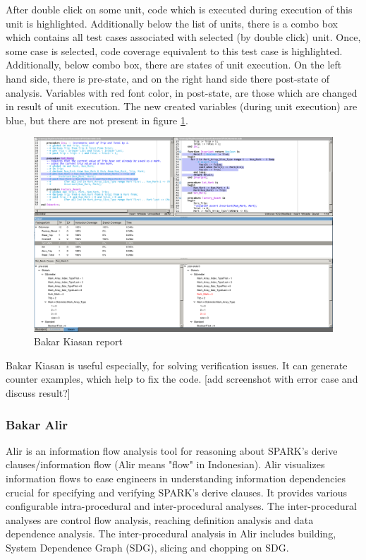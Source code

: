 After double click on some unit, code which is executed during execution of this unit is highlighted. Additionally below the list of units, there is a combo box which contains all test cases associated with selected (by double click) unit. Once, some case is selected, code coverage equivalent to this test case is highlighted. Additionally, below combo box, there are states of unit execution. On the left hand side, there is pre-state, and on the right hand side there post-state of analysis. Variables with red font color, in post-state, are those which are changed in result of unit execution. The new created variables (during unit execution) are blue, but there are not present in figure \ref{figure:kiasan-sample}.

\begin{figure}[ht]%
    \begin{center}
    	\includegraphics[width=1\textwidth]{figures/kiasan-sample.png}    	
    \end{center}
    \caption{Bakar Kiasan report}
    \label{figure:kiasan-sample}
\end{figure}

Bakar Kiasan is useful especially, for solving verification issues. It can generate counter examples, which help to fix the code.
[add screenshot with error case and discuss result?]


\subsubsection{Bakar Alir}
Alir is an information flow analysis tool for reasoning about SPARK's derive clauses/information flow (Alir means "flow" in Indonesian). Alir visualizes information flows to ease engineers in understanding information dependencies crucial for specifying and verifying SPARK's derive clauses. It provides various configurable intra-procedural and inter-procedural analyses. The inter-procedural analyses are control flow analysis, reaching definition analysis and data dependence analysis. The inter-procedural analysis in Alir includes building, System Dependence Graph (SDG), slicing and chopping on SDG. \cite{Hari:Thesis}


